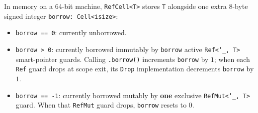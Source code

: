 In memory on a 64-bit machine, \texttt{RefCell<T>} stores \texttt{T} alongside one extra 8-byte signed integer \texttt{borrow: Cell<isize>}:
\begin{itemize}
  \item \texttt{borrow == 0}: currently unborrowed.
  \item \texttt{borrow > 0}: currently borrowed immutably by \texttt{borrow} active \texttt{Ref<'\_, T>} smart-pointer guards. Calling \texttt{.borrow()} increments \texttt{borrow} by $1$; when each \texttt{Ref} guard drops at scope exit, its \texttt{Drop} implementation decrements \texttt{borrow} by $1$.
  \item \texttt{borrow == -1}: currently borrowed mutably by \textbf{one} exclusive \texttt{RefMut<'\_, T>} guard. When that \texttt{RefMut} guard drops, \texttt{borrow} resets to $0$.
\end{itemize}

